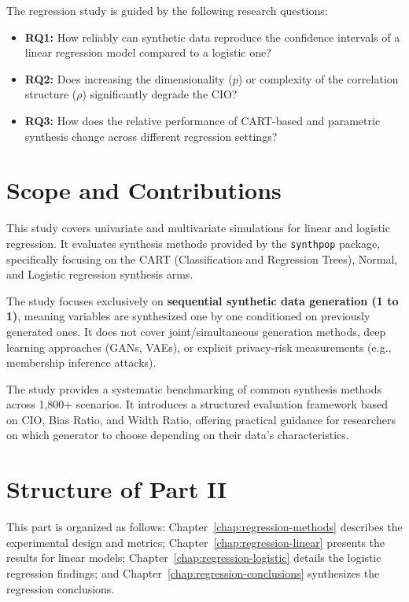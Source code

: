 The regression study is guided by the following research questions:
\begin{itemize}
    \item \textbf{RQ1:} How reliably can synthetic data reproduce the confidence intervals of a linear regression model compared to a logistic one?
    \item \textbf{RQ2:} Does increasing the dimensionality ($p$) or complexity of the correlation structure ($\rho$) significantly degrade the CIO?
    \item \textbf{RQ3:} How does the relative performance of CART-based and parametric synthesis change across different regression settings?
\end{itemize}

\section{Scope and Contributions}
\label{sec:reg-scope}

This study covers univariate and multivariate simulations for linear and logistic regression. It evaluates synthesis methods provided by the \texttt{synthpop} package, specifically focusing on the CART (Classification and Regression Trees), Normal, and Logistic regression synthesis arms.

The study focuses exclusively on \textbf{sequential synthetic data generation (1 to 1)}, meaning variables are synthesized one by one conditioned on previously generated ones. It does not cover joint/simultaneous generation methods, deep learning approaches (GANs, VAEs), or explicit privacy-risk measurements (e.g., membership inference attacks).

The study provides a systematic benchmarking of common synthesis methods across 1,800+ scenarios. It introduces a structured evaluation framework based on CIO, Bias Ratio, and Width Ratio, offering practical guidance for researchers on which generator to choose depending on their data's characteristics.

\section{Structure of Part II}
\label{sec:reg-structure}
This part is organized as follows: Chapter~\ref{chap:regression-methods} describes the experimental design and metrics; Chapter~\ref{chap:regression-linear} presents the results for linear models; Chapter~\ref{chap:regression-logistic} details the logistic regression findings; and Chapter~\ref{chap:regression-conclusions} synthesizes the regression conclusions.
